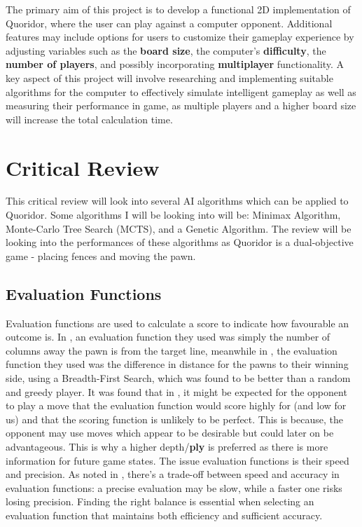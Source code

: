 \documentclass[review]{cmpreport}
\begin{document}
\noindent The primary aim of this project is to develop a functional 2D implementation of Quoridor, where the user can play against a computer opponent. Additional features may include options for users to customize their gameplay experience by adjusting variables such as the \textbf{board size}, the computer's \textbf{difficulty}, the \textbf{number of players}, and possibly incorporating \textbf{multiplayer} functionality. A key aspect of this project will involve researching and implementing suitable algorithms for the computer to effectively simulate intelligent gameplay as well as measuring their performance in game, as multiple players and a higher board size will increase the total calculation time.

\section{Critical Review}
This critical review will look into several AI algorithms which can be applied to Quoridor. Some algorithms I will be looking into will be: Minimax Algorithm, Monte-Carlo Tree Search (MCTS), and a Genetic Algorithm. The review will be looking into the performances of these algorithms as Quoridor is a dual-objective game - placing fences and moving the pawn.

\subsection{Evaluation Functions}
Evaluation functions are used to calculate a score to indicate how favourable an outcome is. In \cite{mertens2006quoridor}, an evaluation function they used was simply the number of columns away the pawn is from the target line, meanwhile in \cite{josequoridor}, the evaluation function they used was the difference in distance for the pawns to their winning side, using a Breadth-First Search, which was found to be better than a random and greedy player. It was found that in \cite{strong2011minimax}, it might be expected for the opponent to play a move that the evaluation function would score highly for (and low for us) and that the scoring function is unlikely to be perfect. This is because, the opponent may use moves which appear to be desirable but could later on be advantageous. This is why a higher depth/\textbf{ply} is preferred as there is more information for future game states. The issue evaluation functions is their speed and precision. As noted in \cite{sanchez2018improving}, there’s a trade-off between speed and accuracy in evaluation functions: a precise evaluation may be slow, while a faster one risks losing precision. Finding the right balance is essential when selecting an evaluation function that maintains both efficiency and sufficient accuracy.
\end{document}
